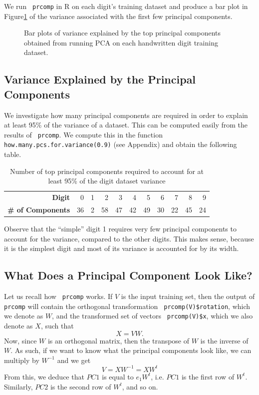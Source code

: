 \documentclass[12pt,article,oneside]{memoir}
\newcommand{\func}[1]{\texttt{\color{red} #1}}
\begin{document}
We run \func{prcomp} in R on each digit's training dataset and produce a bar plot in Figure\ref{fig:digits-pca} of the variance associated with the first few principal components. 

\begin{figure}[htb]
\caption{Bar plots of variance explained by the top principal components obtained from running PCA on each handwritten digit training dataset.}
\label{fig:digits-pca}
\end{figure}

\subsection{Variance Explained by the Principal Components}

We investigate how many principal components are required in order to explain at least 95\% of the variance of a dataset. This can be computed easily from the results of \func{prcomp}. We compute this in the function \func{how.many.pcs.for.variance(0.9)} (see Appendix) and obtain the following table.
\begin{table}[ht]
\centering
\begin{tabular}{rrrrrrrrrrr}
  \hline
  \textbf{Digit}            &   0 &   1 &   2 &   3 &   4 &   5 &   6 &   7 &   8 &   9 \\ 
  \textbf{\# of Components} &  36 &   2 &  58 &  47 &  42 &  49 &  30 &  22 &  45 &  24 \\ 
   \hline
\end{tabular}
\caption{Number of top principal components required to account for at least 95\% of the digit dataset variance}
\end{table}
Observe that the ``simple'' digit 1 requires very few principal components to account for the variance, compared to the other digits. This makes sense, because it is the simplest digit and most of its variance is accounted for by its width.

\subsection{What Does a Principal Component Look Like?}

Let us recall how \func{prcomp} works. If $V$ is the input training set, then the output of \func{prcomp} will contain the orthogonal transformation \func{prcomp(V)\$rotation}, which we denote as $W$, and the transformed set of vectors \func{prcomp(V)\$x}, which we also denote as $X$, such that
	\[X = VW.\]
Now, since $W$ is an orthogonal matrix, then the transpose of $W$ is the inverse of $W$. As such, if we want to know what the principal components look like, we can multiply by $W^{-1}$ and we get
\[V = X W^{-1} = X W^t\]
From this, we deduce that $PC1$ is equal to $e_1 W^t$, i.e. $PC1$ is the first row of $W^t$. Similarly, $PC2$ is the second row of $W^t$, and so on.
\end{document}
